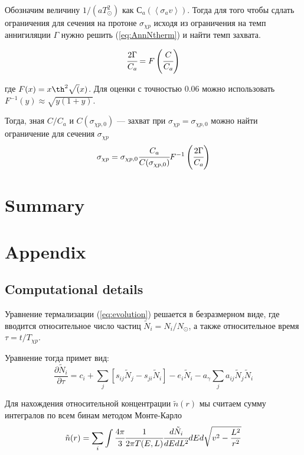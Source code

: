 \documentclass[a4paper, 14pt]{article}
\newcommand{\deriv}[2]{\frac{\partial #1}{\partial #2}}
\newcommand{\avarage}[1]{\left\langle #1 \right\rangle}
\begin{document}
Обозначим величину $1/(aT_{\odot}^2)$ как $С_a(\avarage{\sigma_a v})$. Тогда для того чтобы сдлать ограничения для сечения на протоне $\sigma_{\chi p}$ исходя из ограничения на темп аннигиляции $\Gamma$ нужно решить (\ref{eq:AnnNtherm}) и найти темп захвата.

\begin{equation}
	\cfrac{2\Gamma}{C_a} = 
	F\left(\cfrac{C}{C_a}\right)
\end{equation}

где $F(x) = x\th^2{\sqrt(x)}$. Для оценки с точностью $0.06$ можно использовать $F^{-1}(y) \approx \sqrt{y(1+y)}$.

Тогда, зная $C/C_a$ и $C(\sigma_{\chi p,0})$ --- захват при $\sigma_{\chi p} = \sigma_{\chi p, 0}$ можно найти ограничение для сечения $\sigma_{\chi p}$
\begin{equation}
	\sigma_{\chi p} = \sigma_{\chi p, 0} \cfrac{C_a}{C(\sigma_{\chi p,0})} F^{-1}\left(	\cfrac{2\Gamma}{C_a}\right)
\end{equation}



	
	\section{Summary}
	
	\section{Appendix}
	\subsection{Computational details}
Уравнение термализации (\ref{eq:evolution}) решается в безразмерном виде, где вводится относительное число частиц $\tilde{N}_i = N_i/N_{\odot}$, а также относительное время $\tau = t/T_{\chi p}$.

Уравнение тогда примет вид:
\begin{equation}
	\label{eq:relevolve}
	\deriv{\tilde{N}_i}{\tau} = c_i +
	\sum_j{[s_{ij} \tilde{N}_{j} - s_{ji} \tilde{N}_{i} ]} - e_{i} \tilde{N}_i - a_{\gamma} \sum_j {a_{ij} \tilde{N}_j \tilde{N}_i}
\end{equation}

Для нахождения относительной концентрации $\tilde{n}(r)$ мы считаем сумму интегралов по всем бинам методом Монте-Карло
\begin{equation}
	\label{eq:reldens}
	\tilde{n}(r) = \sum_i{\int{\cfrac{4\pi}{3} \cfrac{1}{2\pi T(E,L)} \cfrac{d\tilde{N}_i}{dEdL^2} dE d\sqrt{v^2-\frac{L^2}{r^2}} }}
\end{equation}
\end{document}
